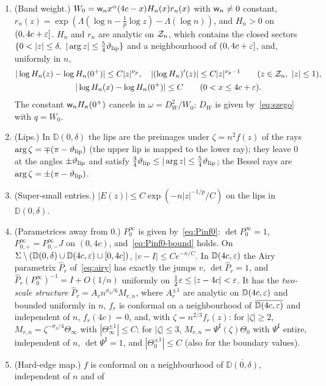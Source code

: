 \begin{proposition}
\begin{enumerate}
\item[(ii)] (Band weight.) $W_0=\mathsf w_n x^\alpha(4c-x)H_n(x)r_n(x)$ with $\mathsf w_n\ne0$ constant,
  $r_n(z)=\exp(\Lambda(\log n-\frac1p\log z)-\Lambda(\log n))$, and $H_n>0$ on $(0,4c+\varepsilon]$. $H_n$ and $r_n$ are
  analytic on $\mathcal{Z}_n$, which contains the closed sectors $\{0<|z|\le\delta,\ |\arg z|\le\frac54\thlip\}$ and a
  neighbourhood of $(0,4c+\varepsilon]$, and, uniformly in $n$,
  \begin{gather*}
    |\log H_n(z)-\log H_n(0^+)|\le C|z|^{\nu_p},\quad |(\log H_n)'(z)|\le C|z|^{\nu_p-1}\qquad(z\in\mathcal{Z}_n,\ |z|\le1),\\
    |\log H_n(x)-\log H_n(0^+)|\le C\qquad(0<x\le4c+\varepsilon).
  \end{gather*}
  The constant $\mathsf w_n H_n(0^+)$ cancels in $\omega=D_W^2/W_0$; $D_W$ is given by~\eqref{eq:szego} with $q=W_0$.
\item[(iii)] (Lips.) In $\mathbb D(0,\delta)$ the lips are the preimages under $\zeta=n^2f(z)$ of the rays
  $\arg\zeta=\mp(\pi-\vartheta_{\mathrm{lip}})$ (the upper lip is mapped to the lower ray); they leave $0$ at the angles $\pm\vartheta_{\mathrm{lip}}$ and
  satisfy $\frac34\vartheta_{\mathrm{lip}}\le|\arg z|\le\frac54\vartheta_{\mathrm{lip}}$; the Bessel rays are $\arg\zeta=\pm(\pi-\vartheta_{\mathrm{lip}})$.
\item[(iv)] (Super-small entries.) $|E(z)|\le C\exp(-n|z|^{-1/p}/C)$ on the lips in $\mathbb D(0,\delta)$.
\item[(v)] (Parametrices away from $0$.) $P^\infty_0$ is given by~\eqref{eq:Pinf0}: $\det P^\infty_0=1$,
  $P^\infty_{0,+}=P^\infty_{0,-}J$ on $(0,4c)$, and~\eqref{eq:Pinf0-bound} holds. On
  $\Sigma\setminus(\mathbb D(0,\delta)\cup \mathbb D(4c,\varepsilon)\cup[0,4c])$, $|v-I|\le Ce^{-n/C}$. In $\mathbb D(4c,\varepsilon)$ the Airy parametrix
  $\hat P_r$ of~\eqref{eq:airy} has exactly the jumps $v$, $\det\hat P_r=1$, and $\hat P_r(P^\infty_0)^{-1}=I+O(1/n)$
  uniformly on $\frac12\varepsilon\le|z-4c|<\varepsilon$. It has the \emph{two-scale structure} $\hat P_r=A_rn^{\sigma_3/6}M_{r,n}$,
  where $A_r^{\pm1}$ are analytic on $\mathbb D(4c,\varepsilon)$ and bounded uniformly in $n$, $f_r$ is conformal on a neighbourhood
  of $\overline{\mathbb D(4c,\varepsilon)}$ and independent of $n$, $f_r(4c)=0$, and, with $\zeta=n^{2/3}f_r(z)$: for $|\zeta|\ge2$,
  $M_{r,n}=\zeta^{-\sigma_3/4}\Theta_\infty$ with $|\Theta_\infty^{\pm1}|\le C$; for $|\zeta|\le3$,
  $M_{r,n}=\Psi^{\mathrm I}(\zeta)\Theta_0$ with $\Psi^{\mathrm I}$ entire, independent of $n$,
  $\det\Psi^{\mathrm I}=1$, and $|\Theta_0^{\pm1}|\le C$ (also for the boundary values).
\item[(vi)] (Hard-edge map.) $f$ is conformal on a neighbourhood of $\overline{\mathbb D(0,\delta)}$, independent of $n$ and of

\end{enumerate}
\end{proposition}
